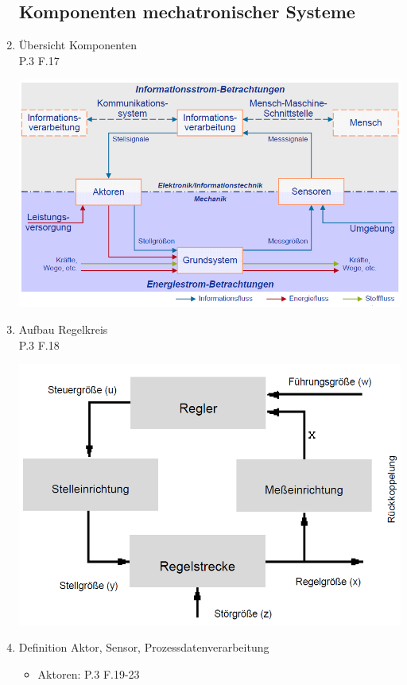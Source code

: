 \documentclass[10pt,a4paper,fleqn]{article}
\begin{document}
\begin{enumerate}
\subsection{Komponenten mechatronischer Systeme}
	\item Übersicht Komponenten\\
		P.3 F.17
		\begin{center}
			\includegraphics[scale=0.4]{komponenten.png}
		\end{center}
	\item Aufbau Regelkreis\\
		P.3 F.18\\
		\begin{center}
			\includegraphics[scale=0.5]{regelkreis.PNG}
		\end{center}		
	\item Definition Aktor, Sensor, Prozessdatenverarbeitung
		\begin{itemize}
		 	\item Aktoren: P.3 F.19-23\\

\end{itemize}
\end{enumerate}
\end{document}
